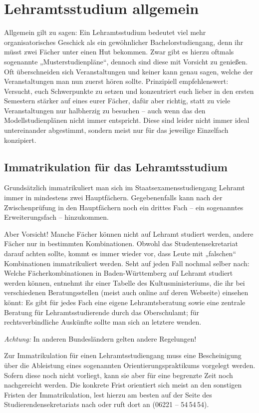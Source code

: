 \section{Lehramtsstudium allgemein}
\label{lehramt_allg}
Allgemein gilt zu sagen: Ein Lehramtsstudium bedeutet viel mehr organisatorisches Geschick als ein gewöhnlicher Bachelorstudiengang, denn ihr müsst zwei Fächer unter einen Hut bekommen. Zwar gibt es hierzu oftmals sogenannte „Musterstudienpläne“, dennoch sind diese mit Vorsicht zu genießen. Oft überschneiden sich Veranstaltungen und keiner kann genau sagen, welche der Veranstaltungen man nun zuerst hören sollte. Prinzipiell empfehlenswert: Versucht, euch Schwerpunkte zu setzen und konzentriert euch lieber in den ersten Semestern stärker auf eines eurer Fächer, dafür aber richtig, statt zu viele Veranstaltungen nur halbherzig zu besuchen -- auch wenn das den Modellstudienplänen nicht immer entspricht. Diese sind leider nicht immer ideal untereinander abgestimmt, sondern meist nur für das jeweilige Einzelfach konzipiert.


\subsection{Immatrikulation für das Lehramtsstudium}

Grundsätzlich immatrikuliert man sich im Staatsexamensstudiengang Lehramt immer in mindestens zwei Hauptfächern. Gegebenenfalls kann nach der Zwischenprüfung in den Hauptfächern noch ein drittes Fach -- ein sogenanntes Erweiterungsfach -- hinzukommen.

Aber Vorsicht! Manche Fächer können nicht auf Lehramt studiert werden, andere Fächer nur in bestimmten Kombinationen. Obwohl das Studentensekretariat darauf achten sollte, kommt es immer wieder vor, dass Leute mit „falschen“ Kombinationen immatrikuliert werden. Seht auf jeden Fall nochmal selber nach: Welche Fächerkombinationen in Baden-Württemberg auf Lehramt studiert werden können, entnehmt ihr einer Tabelle des Kultusministeriums, die ihr bei verschiedenen Beratungsstellen (meist auch online auf deren Webseite) einsehen könnt: Es gibt für jedes Fach eine eigene Lehramtsberatung sowie eine zentrale Beratung für Lehramtsstudierende durch das Oberschulamt; für rechtsverbindliche Auskünfte sollte man sich an letztere wenden.

\emph{Achtung:} In anderen Bundesländern gelten andere Regelungen!


Zur Immatrikulation für einen Lehramtsstudiengang muss eine Bescheinigung über die Ableistung eines sogenannten Orientierungspraktikums vorgelegt werden. Sofern diese noch nicht vorliegt, kann sie aber für eine begrenzte Zeit noch nachgereicht werden. Die konkrete Frist orientiert sich meist an den sonstigen Fristen der Immatrikulation, lest hierzu am besten auf der Seite des Studierendensekretariats nach oder ruft dort an (06221 -- 54\,54\,54).

